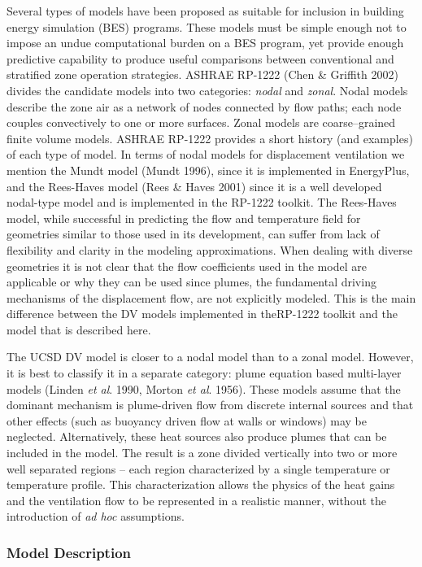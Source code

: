 Several types of models have been proposed as suitable for inclusion in building energy simulation (BES) programs. These models must be simple enough not to impose an undue computational burden on a BES program, yet provide enough predictive capability to produce useful comparisons between conventional and stratified zone operation strategies. ASHRAE RP-1222 (Chen \& Griffith 2002) divides the candidate models into two categories: \emph{nodal} and \emph{zonal}. Nodal models describe the zone air as a network of nodes connected by flow paths; each node couples convectively to one or more surfaces. Zonal models are coarse--grained finite volume models. ASHRAE RP-1222 provides a short history (and examples) of each type of model. In terms of nodal models for displacement ventilation we mention the Mundt model (Mundt 1996), since it is implemented in EnergyPlus, and the Rees-Haves model (Rees \& Haves 2001) since it is a well developed nodal-type model and is implemented in the RP-1222 toolkit. The Rees-Haves model, while successful in predicting the flow and temperature field for geometries similar to those used in its development, can suffer from lack of flexibility and clarity in the modeling approximations. When dealing with diverse geometries it is not clear that the flow coefficients used in the model are applicable or why they can be used since plumes, the fundamental driving mechanisms of the displacement flow, are not explicitly modeled. This is the main difference between the DV models implemented in theRP-1222 toolkit and the model that is described here.

The UCSD DV model is closer to a nodal model than to a zonal model. However, it is best to classify it in a separate category: plume equation based multi-layer models (Linden \emph{et al}. 1990, Morton \emph{et al}. 1956). These models assume that the dominant mechanism is plume-driven flow from discrete internal sources and that other effects (such as buoyancy driven flow at walls or windows) may be neglected. Alternatively, these heat sources also produce plumes that can be included in the model. The result is a zone divided vertically into two or more well separated regions -- each region characterized by a single temperature or temperature profile. This characterization allows the physics of the heat gains and the ventilation flow to be represented in a realistic manner, without the introduction of \emph{ad hoc} assumptions.

\subsubsection{Model Description}\label{model-description-002}

